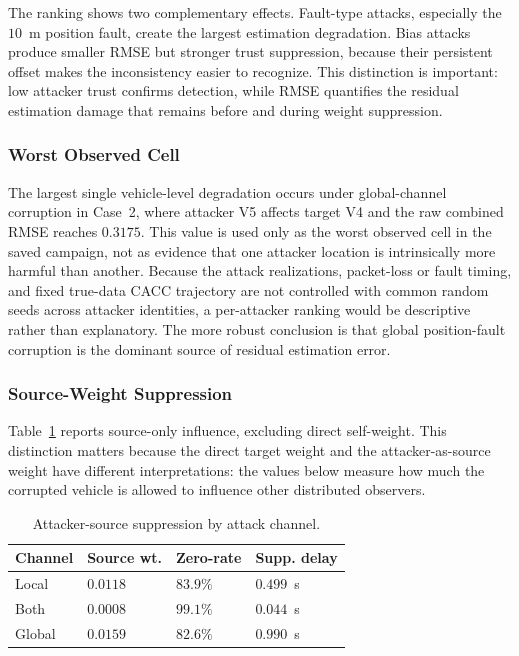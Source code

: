 \documentclass[journal,twoside]{IEEEtran}
\begin{document}
The ranking shows two complementary effects. Fault-type attacks, especially the $10$~m position fault, create the largest estimation degradation. Bias attacks produce smaller RMSE but stronger trust suppression, because their persistent offset makes the inconsistency easier to recognize. This distinction is important: low attacker trust confirms detection, while RMSE quantifies the residual estimation damage that remains before and during weight suppression.

\subsubsection{Worst Observed Cell}

The largest single vehicle-level degradation occurs under global-channel corruption in Case~2, where attacker V5 affects target V4 and the raw combined RMSE reaches $0.3175$. This value is used only as the worst observed cell in the saved campaign, not as evidence that one attacker location is intrinsically more harmful than another. Because the attack realizations, packet-loss or fault timing, and fixed true-data CACC trajectory are not controlled with common random seeds across attacker identities, a per-attacker ranking would be descriptive rather than explanatory. The more robust conclusion is that global position-fault corruption is the dominant source of residual estimation error.

\subsubsection{Source-Weight Suppression}

Table~\ref{tab:source_suppression_by_channel} reports source-only influence, excluding direct self-weight. This distinction matters because the direct target weight and the attacker-as-source weight have different interpretations: the values below measure how much the corrupted vehicle is allowed to influence other distributed observers.

\begin{table}[!t]
\centering
\caption{Attacker-source suppression by attack channel.}
\label{tab:source_suppression_by_channel}
\scriptsize
\begin{tabular}{p{1.0cm}p{1.45cm}p{1.25cm}p{1.65cm}}
\toprule
\textbf{Channel} & \textbf{Source wt.} & \textbf{Zero-rate} & \textbf{Supp. delay} \\
\midrule
Local  & $0.0118$ & $83.9\%$ & $0.499$~s \\
Both   & $0.0008$ & $99.1\%$ & $0.044$~s \\
Global & $0.0159$ & $82.6\%$ & $0.990$~s \\
\bottomrule
\end{tabular}
\end{table}
\end{document}
